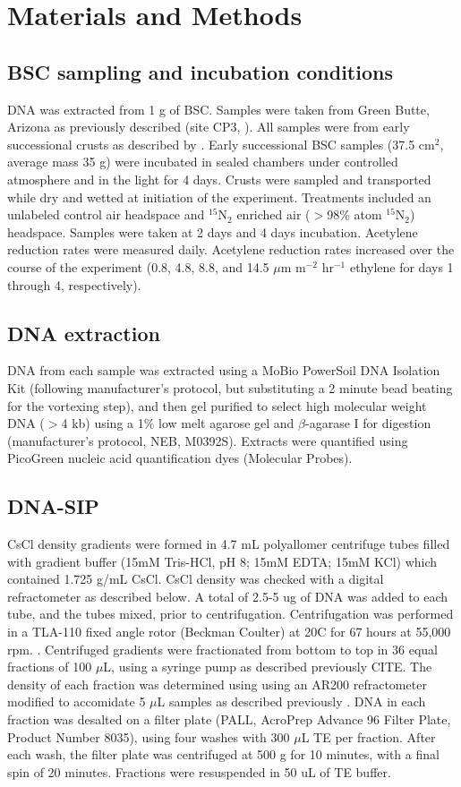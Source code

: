 \section{Materials and Methods}
\subsection{BSC sampling and incubation conditions}
DNA was extracted from 1 g of BSC. Samples were taken from Green Butte, Arizona
as previously described (site CP3, \citet{BERALDI_CAMPESI_2009}). All samples
were from early successional crusts as described by \cite{15643930}.  Early
successional BSC samples (37.5 cm$^{2}$, average mass 35 g) were incubated in
sealed chambers under controlled atmosphere and in the light for 4 days. Crusts
were sampled and transported while dry and wetted at initiation of the
experiment. Treatments included an unlabeled control air headspace and
$^{15}$N$_{2}$ enriched air ($>$98\% atom $^{15}$N$_{2}$) headspace. Samples
were taken at 2 days and 4 days incubation. Acetylene reduction rates were
measured daily. Acetylene reduction rates increased over the course of the
experiment (0.8, 4.8, 8.8, and 14.5 $\mu$m m$^{-2}$ hr$^{-1}$ ethylene for days
1 through 4, respectively). 

\subsection{DNA extraction}
DNA from each sample was extracted using a MoBio PowerSoil DNA Isolation Kit
(following manufacturer’s protocol, but substituting a 2 minute bead beating
for the vortexing step), and then gel purified to select high molecular 
weight DNA ($>$4 kb) using a 1\% low melt agarose gel and $\beta$-agarase I for
digestion (manufacturer's protocol, NEB, M0392S).  Extracts were quantified using
PicoGreen nucleic acid quantification dyes (Molecular Probes).

\subsection{DNA-SIP} CsCl density gradients were formed in 4.7 mL polyallomer
centrifuge tubes filled with gradient buffer (15mM Tris-HCl, pH 8; 15mM EDTA;
15mM KCl) which contained 1.725 g/mL CsCl. CsCl density was checked with a
digital refractometer as described below. A total of 2.5-5 ug of DNA was added
to each tube, and the tubes mixed, prior to centrifugation. Centrifugation was
performed in a TLA-110 fixed angle rotor (Beckman Coulter) at 20C for 67 hours
at 55,000 rpm. \citep{17369332}. Centrifuged gradients were fractionated from
bottom to top in 36 equal fractions of 100 $\mu$L, using a syringe pump as
described previously CITE. The density of each fraction was determined
using using an AR200 refractometer modified to accomidate 5 $\mu$L samples as 
described previously \citep{17369332}. DNA in each fraction was desalted on a
filter plate (PALL, AcroPrep Advance 96 Filter Plate, Product Number 8035),
using four washes with 300 $\mu$L TE per fraction. After each wash, the filter
plate was centrifuged at 500 g for 10 minutes, with a final spin of 20 minutes.
Fractions were resuspended in 50 uL of TE buffer.

